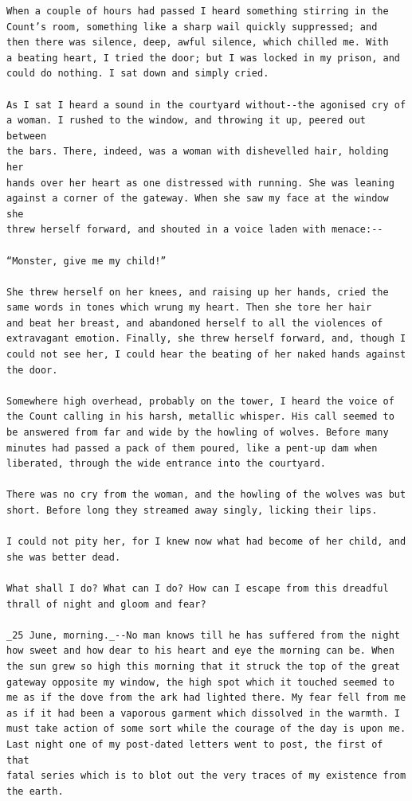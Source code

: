 \documentclass{article}
\begin{document}
\begin{verbatim}
When a couple of hours had passed I heard something stirring in the
Count’s room, something like a sharp wail quickly suppressed; and
then there was silence, deep, awful silence, which chilled me. With
a beating heart, I tried the door; but I was locked in my prison, and
could do nothing. I sat down and simply cried.

As I sat I heard a sound in the courtyard without--the agonised cry of
a woman. I rushed to the window, and throwing it up, peered out between
the bars. There, indeed, was a woman with dishevelled hair, holding her
hands over her heart as one distressed with running. She was leaning
against a corner of the gateway. When she saw my face at the window she
threw herself forward, and shouted in a voice laden with menace:--

“Monster, give me my child!”

She threw herself on her knees, and raising up her hands, cried the
same words in tones which wrung my heart. Then she tore her hair
and beat her breast, and abandoned herself to all the violences of
extravagant emotion. Finally, she threw herself forward, and, though I
could not see her, I could hear the beating of her naked hands against
the door.

Somewhere high overhead, probably on the tower, I heard the voice of
the Count calling in his harsh, metallic whisper. His call seemed to
be answered from far and wide by the howling of wolves. Before many
minutes had passed a pack of them poured, like a pent-up dam when
liberated, through the wide entrance into the courtyard.

There was no cry from the woman, and the howling of the wolves was but
short. Before long they streamed away singly, licking their lips.

I could not pity her, for I knew now what had become of her child, and
she was better dead.

What shall I do? What can I do? How can I escape from this dreadful
thrall of night and gloom and fear?

_25 June, morning._--No man knows till he has suffered from the night
how sweet and how dear to his heart and eye the morning can be. When
the sun grew so high this morning that it struck the top of the great
gateway opposite my window, the high spot which it touched seemed to
me as if the dove from the ark had lighted there. My fear fell from me
as if it had been a vaporous garment which dissolved in the warmth. I
must take action of some sort while the courage of the day is upon me.
Last night one of my post-dated letters went to post, the first of that
fatal series which is to blot out the very traces of my existence from
the earth.


\end{verbatim}
\end{document}
